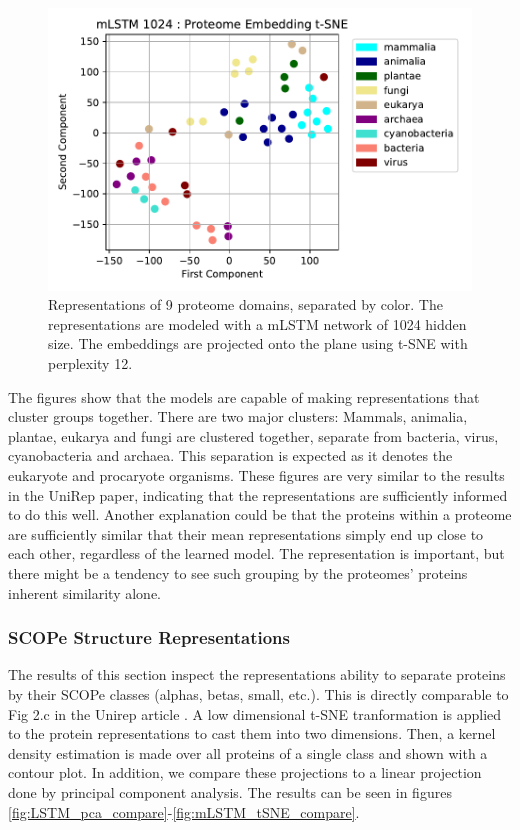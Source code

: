 \documentclass[a4paper,12pt]{article}
\begin{document}
\begin{figure}[H]
    \centering
    \includegraphics[width=0.95\linewidth]{figures/fig2b_mLSTM_1024_no_trunc.pdf}
    \caption{Representations of 9 proteome domains, separated by color. The representations are modeled with a mLSTM network of 1024 hidden size. The embeddings are projected onto the plane using t-SNE with perplexity 12.}
    \label{fig:fig2b_mLSTM}
\end{figure}

The figures show that the models are capable of making representations that cluster groups together. There are two major clusters: Mammals, animalia, plantae, eukarya and fungi are clustered together, separate from bacteria, virus, cyanobacteria and archaea. This separation is expected as it denotes the eukaryote and procaryote organisms. These figures are very similar to the results in the UniRep paper, indicating that the representations are sufficiently informed to do this well. Another explanation could be that the proteins within a proteome are sufficiently similar that their mean representations simply end up close to each other, regardless of the learned model. The representation is important, but there might be a tendency to see such grouping by the proteomes' proteins inherent similarity alone.

\subsubsection{SCOPe Structure Representations}
\label{section:SCOPe}
The results of this section inspect the representations ability to separate proteins by their SCOPe classes (alphas, betas, small, etc.). This is directly comparable to Fig 2.c in the Unirep article \cite{alley2019unified}. A low dimensional t-SNE tranformation is applied to the protein representations to cast them into two dimensions. Then, a kernel density estimation is made over all proteins of a single class and shown with a contour plot. In addition, we compare these projections to a linear projection done by principal component analysis. The results can be seen in figures \ref{fig:LSTM_pca_compare}-\ref{fig:mLSTM_tSNE_compare}.
\end{document}
